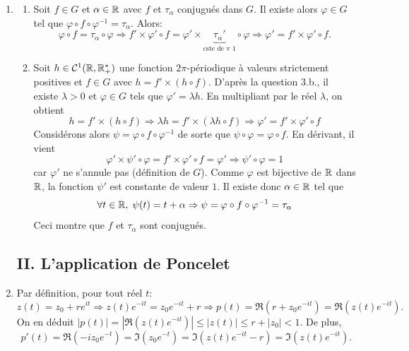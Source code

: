\begin{enumerate}
\item
\begin{enumerate}
  \item Soit $f\in G$ et $\alpha \in \mathbb{R}$ avec $f$ et $\tau_{\alpha}$ conjugués dans $G$. Il existe alors $\varphi \in G$ tel que $\varphi \circ f \circ \varphi^{-1} = \tau_{\alpha}$. Alors:
\[
  \varphi \circ f = \tau_\alpha \circ \varphi 
  \Rightarrow f' \times \varphi'\circ f =  \varphi' \times \underset{\text{cste de v $1$}}{\underbrace{{\tau_\alpha}'}}\circ \varphi 
  \Rightarrow \varphi' = f' \times \varphi'\circ f.
\]
  
  \item Soit $h\in \mathcal{C}^{1}(\mathbb{R}, \mathbb{R}_{+}^{*})$ une fonction $2\pi$-périodique à valeurs strictement positives et $f\in G$ avec $h = f' \times (h\circ f)$.\newline
  D'après la question 3.b., il existe $\lambda >0$ et $\varphi \in G$ tels que $\varphi' = \lambda h$. En multipliant par le réel $\lambda$, on obtient
\[
  h = f' \times (h\circ f) \Rightarrow \lambda h = f' \times (\lambda h\circ f)
  \Rightarrow \varphi' = f' \times \varphi' \circ f
\]
Considérons alors $\psi = \varphi \circ f \circ \varphi^{-1}$ de sorte que $\psi \circ \varphi = \varphi \circ f$. En dérivant, il vient
\[
  \varphi' \times \psi' \circ \varphi = f' \times \varphi' \circ f = \varphi' \Rightarrow \psi' \circ \varphi = 1
\]
car $\varphi'$ ne s'annule pas (définition de $G$). Comme $\varphi$ est bijective de $\mathbb{R}$ dans $\mathbb{R}$, la fonction $\psi'$ est constante de valeur $1$. Il existe donc $\alpha \in \mathbb{R}$ tel que 
\[
  \forall t \in \mathbb{R}, \; \psi(t) = t + \alpha \Rightarrow \psi = \varphi \circ f \circ \varphi^{-1} = \tau_\alpha
\]
Ceci montre que $f$ et $\tau_{\alpha}$ sont conjugués.
\end{enumerate}



\subsection*{II. L'application de Poncelet}
\item Par définition, pour tout réel $t$: 
\[
 z(t) = z_0 + re^{it}\Rightarrow z(t)e^{-it} = z_0e^{-it} + r \Rightarrow p(t) = \Re(r + z_0 e^{-it}) = \Re(z(t)e^{-it}).
\]
On en déduit $|p(t)| = \left|\Re(z(t)e^{-it})\right| \leq \left|z(t)\right|\leq r + |z_0| < 1$.\newline
De plus, 
\[
p'(t) = \Re(-iz_0 e^{-t}) = \Im(z_0 e^{-t}) = \Im(z(t)e^{-it} - r ) = \Im(z(t)e^{-it}).
\]


\end{enumerate}
